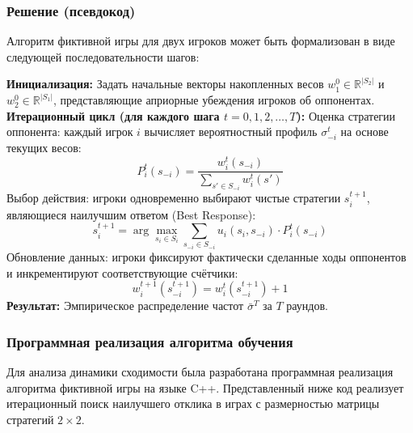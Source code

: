 \subsubsection{Решение (псевдокод)}

Алгоритм фиктивной игры для двух игроков может быть формализован в виде следующей последовательности шагов:

\begin{algorithm}[H]
\caption{Fictitious Play: итеративная схема обучения двух игроков}
\begin{algorithmic}[1]
    \State \textbf{Инициализация:}
    \State Задать начальные векторы накопленных весов $w_1^0 \in \mathbb{R}^{|S_2|}$ и $w_2^0 \in \mathbb{R}^{|S_1|}$, представляющие априорные убеждения игроков об оппонентах.
    \State \textbf{Итерационный цикл (для каждого шага $t = 0, 1, 2, \dots, T$):}
    \State Оценка стратегии оппонента: каждый игрок $i$ вычисляет вероятностный профиль $\sigma_{-i}^t$ на основе текущих весов:
    \begin{equation}
        P_i^t(s_{-i}) = \frac{w_i^t(s_{-i})}{\sum_{s' \in S_{-i}} w_i^t(s')}
    \end{equation}
    \State Выбор действия: игроки одновременно выбирают чистые стратегии $s_i^{t+1}$, являющиеся наилучшим ответом (Best Response):
    \begin{equation}
        s_i^{t+1} = \arg\max_{s_i \in S_i} \sum_{s_{-i} \in S_{-i}} u_i(s_i, s_{-i}) \cdot P_i^t(s_{-i})
    \end{equation}
    \State Обновление данных: игроки фиксируют фактически сделанные ходы оппонентов и инкрементируют соответствующие счётчики:
    \begin{equation}
        w_i^{t+1}(s_{-i}^{t+1}) = w_i^t(s_{-i}^{t+1}) + 1
    \end{equation}
    \State \textbf{Результат:} Эмпирическое распределение частот $\bar{\sigma}^T$ за $T$ раундов.
\end{algorithmic}
\end{algorithm}

\subsubsection{Программная реализация алгоритма обучения}

Для анализа динамики сходимости была разработана программная реализация алгоритма фиктивной игры на языке C++. Представленный ниже код реализует итерационный поиск наилучшего отклика в играх с размерностью матрицы стратегий $2 \times 2$. 

